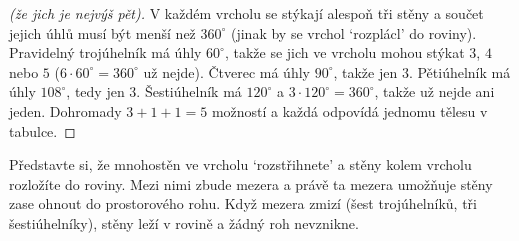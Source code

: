 \begin{proof}[(že jich je nejvýš pět)]
  V každém vrcholu se stýkají alespoň tři stěny a součet jejich úhlů musí být menší než $360^\circ$ (jinak by se vrchol `rozplácl' do roviny). Pravidelný trojúhelník má úhly $60^\circ$, takže se jich ve vrcholu mohou stýkat $3$, $4$ nebo $5$ ($6\cdot 60^\circ = 360^\circ$ už nejde). Čtverec má úhly $90^\circ$, takže jen $3$. Pětiúhelník má úhly $108^\circ$, tedy jen $3$. Šestiúhelník má $120^\circ$ a $3\cdot 120^\circ = 360^\circ$, takže už nejde ani jeden. Dohromady $3 + 1 + 1 = 5$ možností a každá odpovídá jednomu tělesu v tabulce.
\end{proof}

Představte si, že mnohostěn ve vrcholu `rozstřihnete' a stěny kolem vrcholu rozložíte do roviny. Mezi nimi zbude mezera a právě ta mezera umožňuje stěny zase ohnout do prostorového rohu. Když mezera zmizí (šest trojúhelníků, tři šestiúhelníky), stěny leží v rovině a žádný roh nevznikne.

